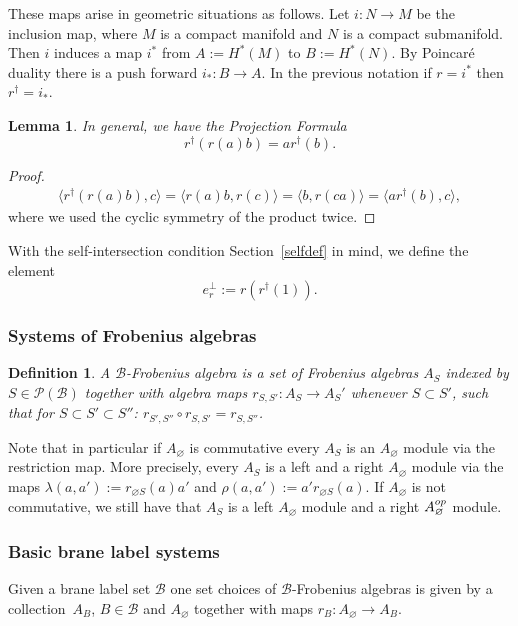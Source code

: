 \documentclass[11pt]{article}
\newtheorem{lem}[thm]{Lemma}
\newtheorem{df}[thm]{Definition}
\def\calB{{\mathcal B}}
\def\calP{{\mathcal P}}
\def\la{\langle}
\def\ra{\rangle}
\begin{document}
These maps arise
in geometric situations as follows. Let $i:N \to M $ be the inclusion map, where $M$ is a compact manifold and $N$ is a compact submanifold. Then $i$ induces a map $i^*$ from
$A:=H^*(M)$ to $B:=H^*(N)$. By Poincar\'e duality there is a push forward $i_*:B\to A$. In the previous notation if  $r=i^*$ then $r^{\dagger}=i_*$.


\begin{lem}In general, we have the Projection Formula
\begin{equation*}
r^{\dagger}(r(a)b)=ar^{\dagger}(b). %
\end{equation*}
\end{lem}
\begin{proof}
\begin{gather*}
\la r^{\dagger}(r(a)b), c\ra = \la r(a)b,r(c)\ra = \la b, r(ca)\ra = \la ar^{\dagger}(b),c\ra,
\end{gather*}
where we used the cyclic symmetry of the product twice.
\end{proof}

With  the self-intersection condition Section~\ref{selfdef} in mind, we def\/ine the element
\begin{equation*}
e_r^{\perp}:=r (r^{\dagger}(1)).
\end{equation*}

\subsubsection{Systems of Frobenius algebras}
\begin{df} A $\calB$-Frobenius algebra is a set of Frobenius
algebras $A_S$ indexed by $S\in \calP(\calB)$ together with algebra maps
$r_{S,S'}:A_S\to A_S'$ whenever $S\subset S'$,
such that for $S\subset S'\subset S''$: $r_{S',S''}\circ r_{S,S'}=r_{S,S''}$.
\end{df}



Note that in particular if $A_{\varnothing}$ is commutative
every $A_S$ is an $A_{\varnothing}$ module via
the restriction map. More precisely,  every $A_S$ is a left and a right $A_{\varnothing}$
module via the maps $\lambda (a,a'):= r_{\varnothing S}(a)a'$
and $\rho(a,a') :=a' r_{\varnothing S}(a)$. If $A_{\varnothing}$ is not commutative,
we still have that $A_S$ is a left $A_{\varnothing}$ module and a right $A_{\varnothing}^{\rm op}$ module.


\subsubsection{Basic brane label systems}
Given a  brane label set $\calB$ one set choices of $\calB$-Frobenius algebras is given by
a collection~$A_B$, $B\in \calB$ and $A_{\varnothing}$ together with maps $r_B:A_{\varnothing}\to A_B$.
\end{document}
